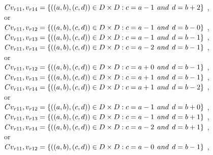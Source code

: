 \\$C{v_{r11},v_{r14}}=\{((a,b),(c,d))\in D\times D: c = a - 1\hspace{1ex} and \hspace{1ex}  d = b + 2 \}$ , 
\\or
\\$C{v_{r11},v_{r12}}=\{((a,b),(c,d))\in D\times D: c = a - 1\hspace{1ex} and \hspace{1ex}  d = b - 0 \}$ , 
\\$C{v_{r11},v_{r13}}=\{((a,b),(c,d))\in D\times D: c = a - 1\hspace{1ex} and \hspace{1ex}  d = b - 1 \}$ , 
\\$C{v_{r11},v_{r14}}=\{((a,b),(c,d))\in D\times D: c = a - 2\hspace{1ex} and \hspace{1ex}  d = b - 1 \}$ , 
\\or
\\$C{v_{r11},v_{r12}}=\{((a,b),(c,d))\in D\times D: c = a + 0\hspace{1ex} and \hspace{1ex}  d = b - 1 \}$ , 
\\$C{v_{r11},v_{r13}}=\{((a,b),(c,d))\in D\times D: c = a + 1\hspace{1ex} and \hspace{1ex}  d = b - 1 \}$ , 
\\$C{v_{r11},v_{r14}}=\{((a,b),(c,d))\in D\times D: c = a + 1\hspace{1ex} and \hspace{1ex}  d = b - 2 \}$ , 
\\or
\\$C{v_{r11},v_{r12}}=\{((a,b),(c,d))\in D\times D: c = a - 1\hspace{1ex} and \hspace{1ex}  d = b + 0 \}$ , 
\\$C{v_{r11},v_{r13}}=\{((a,b),(c,d))\in D\times D: c = a - 1\hspace{1ex} and \hspace{1ex}  d = b + 1 \}$ , 
\\$C{v_{r11},v_{r14}}=\{((a,b),(c,d))\in D\times D: c = a - 2\hspace{1ex} and \hspace{1ex}  d = b + 1 \}$ , 
\\or
\\$C{v_{r11},v_{r12}}=\{((a,b),(c,d))\in D\times D: c = a - 0\hspace{1ex} and \hspace{1ex}  d = b - 1 \}$ , 
